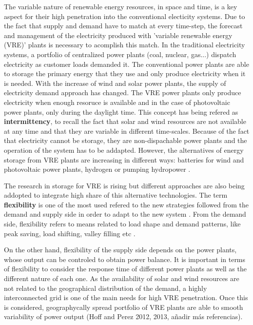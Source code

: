 The variable nature of renewable energy resources, in space and time, is a key aspect for their high penetration into the conventional electicity systems. Due to the fact that supply and demand have to match at every time-step, the forecast and management of the electricity produced with 'variable renewable energy (VRE)' plants is necessary to acomplish this match. In the traditional electricity systems, a portfolio of centralized power plants (coal, nuclear, gas...) dispatch electricity as customer loads demanded it. The conventional power plants are able to storage the primary energy that they use and only produce electricity when it is needed. With the increase of wind and solar power plants, the supply of electricity demand approach has changed. The VRE power plants only produce electricity when enough resoruce is available and in the case of photovoltaic power plants, only during the daylight time. This concept has being refered as \textbf{intermittency}, to recall the fact that solar and wind resources are not available at any time and that they are variable in different time-scales. Because of the fact that electricity cannot be storage, they are non-dispachable power plants and the operation of the system has to be addapted. However, the alternatives of energy storage from VRE plants are increasing in different ways: batteries for wind and photovoltaic power plants, hydrogen or pumping hydropower \cite*{Lund2015, Blanco2018, Schaber2004}.

The research in storage for VRE is rising but different approaches are also being addopted to integrate high share of this alternative technologies. The term \textbf{flexibility} is one of the most used refered to the new strategies followed from the demand and supply side in order to adapt to the new system \cite*{KROPOSKI2017}. From the demand side, flexibility refers to means related to load shape and demand patterns, like peak saving, load shifting, valley filling etc \cite*{Lund2015}.

On the other hand, flexibility of the supply side depends on the power plants, whose output can be controled to obtain power balance. It is important in terms of flexibility to consider the response time of different power plants as well as the different nature of each one. As the availability of solar and wind resources are not related to the geographical distribution of the demand, a highly interconnected grid is one of the main needs for high VRE penetration. Once this is considered, geographycally spread portfolio of VRE plants are able to smooth variability of power output \cite*{KROPOSKI2017, Marcos2012}(Hoff and Perez 2012, 2013, añadir más referencias).

